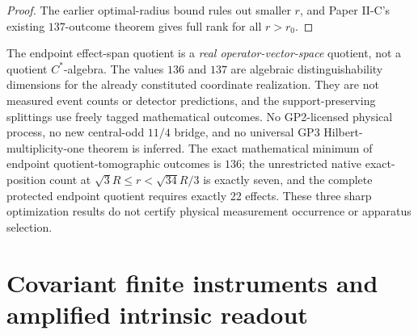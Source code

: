 \documentclass[12pt,a4paper]{article}
\begin{document}
\begin{proof}
The earlier optimal-radius bound rules out smaller $r$, and
Paper II-C's existing $137$-outcome theorem gives full rank for
all $r>r_0$.
\end{proof}



\begin{remark}
\label{p2c:rem:v355-endpoint-physical-firewall}
The endpoint effect-span quotient is a \emph{real operator-vector-space}
quotient, not a quotient $C^*$-algebra. The values $136$ and $137$ are
algebraic distinguishability dimensions for the already constituted
coordinate realization. They are not measured event counts or detector
predictions, and the support-preserving splittings use freely tagged
mathematical outcomes. No GP2-licensed physical process, no new central-odd
$11/4$ bridge, and no universal GP3 Hilbert-multiplicity-one theorem is
inferred. The exact mathematical minimum of endpoint quotient-tomographic outcomes
is $136$; the unrestricted native exact-position count at
$\sqrt3 R\le r<\sqrt{34}R/3$ is exactly seven, and the complete
protected endpoint quotient requires exactly 22 effects. These three
sharp optimization results do not certify physical measurement
occurrence or apparatus selection.
\end{remark}


\section{Covariant finite instruments and amplified intrinsic readout}
\end{document}
